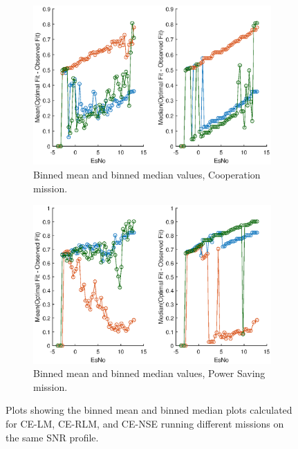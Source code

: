 \begin{figure}[ht]

\begin{subfigure}{\linewidth}
\centering
\includegraphics[width=\textwidth]{figures/c_sim_results/sim22_binnedMeanMedian.eps}
\caption{Binned mean and binned median values, Cooperation mission.}
\label{fig:cSimBinMeanMed}
\end{subfigure}
\begin{subfigure}{\linewidth}
\centering
\includegraphics[width=\textwidth]{figures/c_sim_results/sim22_binnedMeanMedian_powersave.eps}
\caption{Binned mean and binned median values, Power Saving mission.}
\label{fig:cSimBinMeanMedPwr}
\end{subfigure}
\caption{Plots showing the binned mean and binned median plots calculated for CE-LM, CE-RLM, and CE-NSE running different missions on the same SNR profile.}
\label{fig:cSimBinMeanMed}
\end{figure}

